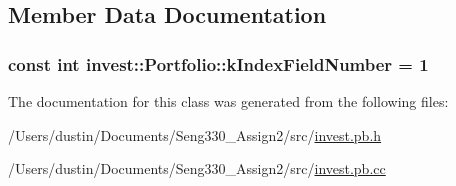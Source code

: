 \subsection{Member Data Documentation}
\hypertarget{classinvest_1_1_portfolio_ac70257eca9bdfd85f7a37b33eb8a8a24}{}
\subsubsection[{k\+Index\+Field\+Number}]{\setlength{\rightskip}{0pt plus 5cm}const int invest\+::\+Portfolio\+::k\+Index\+Field\+Number = 1\hspace{0.3cm}{\ttfamily [static]}}\label{classinvest_1_1_portfolio_ac70257eca9bdfd85f7a37b33eb8a8a24}


The documentation for this class was generated from the following files\+:\begin{DoxyCompactItemize}
\item 
/\+Users/dustin/\+Documents/\+Seng330\+\_\+\+Assign2/src/\hyperlink{invest_8pb_8h}{invest.\+pb.\+h}\item 
/\+Users/dustin/\+Documents/\+Seng330\+\_\+\+Assign2/src/\hyperlink{invest_8pb_8cc}{invest.\+pb.\+cc}\end{DoxyCompactItemize}
